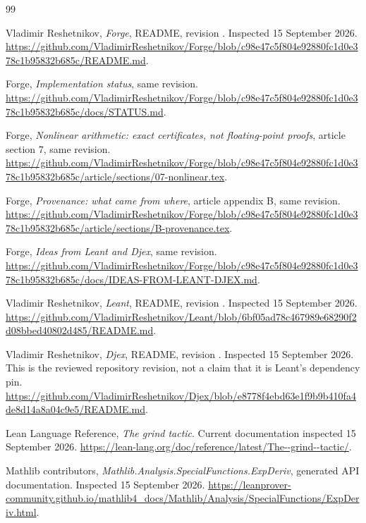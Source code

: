\clearpage
{}
\begin{thebibliography}{99}
\small
\setlength{\itemsep}{1pt}
\setlength{\parsep}{0pt}
\setlength{\parskip}{0pt}
\raggedright
{}
Vladimir Reshetnikov, \emph{Forge}, README, revision . Inspected 15 September 2026.
\url{https://github.com/VladimirReshetnikov/Forge/blob/c98e47c5f804e92880fc1d0e378c1b95832b685c/README.md}.

Forge, \emph{Implementation status}, same revision.
\url{https://github.com/VladimirReshetnikov/Forge/blob/c98e47c5f804e92880fc1d0e378c1b95832b685c/docs/STATUS.md}.

Forge, \emph{Nonlinear arithmetic: exact certificates, not floating-point proofs}, article section 7, same revision.
\url{https://github.com/VladimirReshetnikov/Forge/blob/c98e47c5f804e92880fc1d0e378c1b95832b685c/article/sections/07-nonlinear.tex}.

Forge, \emph{Provenance: what came from where}, article appendix B, same revision.
\url{https://github.com/VladimirReshetnikov/Forge/blob/c98e47c5f804e92880fc1d0e378c1b95832b685c/article/sections/B-provenance.tex}.

Forge, \emph{Ideas from Leant and Djex}, same revision.
\url{https://github.com/VladimirReshetnikov/Forge/blob/c98e47c5f804e92880fc1d0e378c1b95832b685c/docs/IDEAS-FROM-LEANT-DJEX.md}.

Vladimir Reshetnikov, \emph{Leant}, README, revision . Inspected 15 September 2026.
\url{https://github.com/VladimirReshetnikov/Leant/blob/6bf05ad78c467989e68290f2d08bbed40802d485/README.md}.

Vladimir Reshetnikov, \emph{Djex}, README, revision . Inspected 15 September 2026. This is the reviewed repository revision, not a claim that it is Leant's dependency pin.
\url{https://github.com/VladimirReshetnikov/Djex/blob/e8778f4ebd63e1f9b9b410fa4de8d14a8a04c9e5/README.md}.

Lean Language Reference, \emph{The grind tactic}. Current documentation inspected 15 September 2026.
\url{https://lean-lang.org/doc/reference/latest/The--grind--tactic/}.

Mathlib contributors, \emph{Mathlib.Analysis.SpecialFunctions.ExpDeriv}, generated API documentation. Inspected 15 September 2026.
\url{https://leanprover-community.github.io/mathlib4_docs/Mathlib/Analysis/SpecialFunctions/ExpDeriv.html}.


\end{thebibliography}
